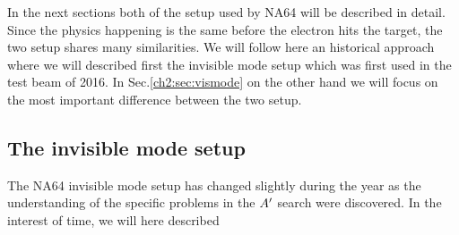 In the next sections both of the setup used by NA64 will be described in detail. Since the physics happening is the same before the electron hits the target, the two setup shares many similarities. We will follow here an historical approach where we will described first the invisible mode setup which was first used in the test beam of 2016. In Sec.\ref{ch2:sec:vismode} on the other hand we will focus on the most important difference between the two setup.

\subsection{The invisible mode setup}
\label{ch2:sec:invismode}

The NA64 invisible mode setup has changed slightly during the year as the understanding of the specific problems in the $A'$ search were discovered. In the interest of time, we will here described 

